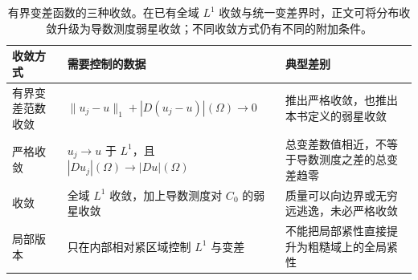 \begin{table}[htbp]
\centering\small\renewcommand{\arraystretch}{1.18}\setlength{\tabcolsep}{4pt}
\caption[有界变差函数的三种收敛]{有界变差函数的三种收敛。在已有全域 \(L^1\) 收敛与统一变差界时，正文可将分布收敛升级为导数测度弱星收敛；不同收敛方式仍有不同的附加条件。}
\label{b1:tab:visual-t15}
\begin{tabularx}{\linewidth}{@{}>{\raggedright\arraybackslash}p{3.1cm}>{\raggedright\arraybackslash}p{4.7cm}>{\raggedright\arraybackslash}X@{}}
\toprule
收敛方式 & 需要控制的数据 & 典型差别 \\
\midrule
有界变差范数收敛 & \(\|u_j-u\|_1+|D(u_j-u)|(\Omega)\to0\) & 推出严格收敛，也推出本书定义的弱星收敛 \\
严格收敛 & \(u_j\to u\) 于 \(L^1\)，且 \(|Du_j|(\Omega)\to|Du|(\Omega)\) & 总变差数值相近，不等于导数测度之差的总变差趋零 \\
\WeakStar{}收敛 & 全域 \(L^1\) 收敛，加上导数测度对 \(C_0\) 的弱星收敛 & 质量可以向边界或无穷远逃逸，未必严格收敛 \\
局部版本 & 只在内部相对紧区域控制 \(L^1\) 与变差 & 不能把局部紧性直接提升为粗糙域上的全局紧性 \\
\bottomrule
\end{tabularx}
\end{table}
